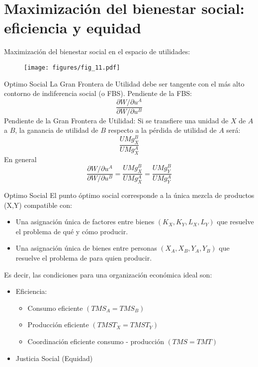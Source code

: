 \section{Maximización del bienestar social: eficiencia y equidad}

\begin{frame}{Maximización del bienestar social en el espacio de utilidades:}
	\begin{figure}[!h]
		\centering
		\hspace{0.3cm}\texttt{[image: figures/fig\_11.pdf]}
	\end{figure}
\end{frame}
\begin{frame}{Optimo Social}
	La Gran Frontera de Utilidad debe ser tangente con el más alto contorno de indiferencia social (o FBS). Pendiente de la FBS:
			$$\frac{\partial W/\partial u^A}{\partial W/\partial u^B}$$
	Pendiente de la Gran Frontera de Utilidad: Si se transfiere una unidad de $X$ de $A$ a $B$, la ganancia de utilidad de $B$ respecto a la pérdida de utilidad de $A$ será:
		$$\frac{UMg_{X}^{B}}{UMg_{X}^{A}}$$	
	En general
		$$\frac{\partial W/\partial u^A}{\partial W/\partial u^B} = \frac{UMg_{X}^{B}}{UMg_{X}^{A}} = \frac{UMg_{Y}^{B}}{UMg_{Y}^{A}}$$
\end{frame}
\begin{frame}{Optimo Social}
	El punto óptimo social corresponde a la única mezcla de productos (X,Y) compatible con:
		\begin{itemize}
			\item Una asignación única de factores entre bienes $(K_X, K_Y, L_X, L_Y)$ que resuelve el problema de qué y cómo producir.
			\item Una asignación única de bienes entre personas $(X_A, X_B, Y_A, Y_B)$ que resuelve el problema de para quien producir.
		\end{itemize}
	Es decir, las condiciones para una organización económica ideal son:
		\begin{itemize}
			\item Eficiencia:
			\begin{itemize}
				\item Consumo eficiente $(TMS_A = TMS_B)$
				\item Producción eficiente $(TMST_X=TMST_Y)$
				\item Coordinación eficiente consumo - producción $(TMS=TMT)$
			\end{itemize}
			\item Justicia Social (Equidad)
		\end{itemize}
\end{frame}